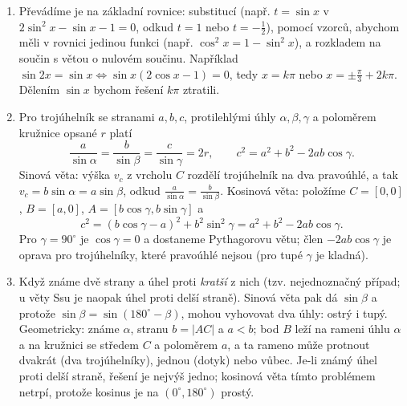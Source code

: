 \begin{enumerate}[label=\textbf{\arabic*.}, leftmargin=*, itemsep=0.8em]
  \item {}
  Převádíme je na základní rovnice: substitucí (např. $t = \sin x$ v $2\sin^2 x - \sin x - 1 = 0$, odkud $t = 1$ nebo $t = -\frac{1}{2}$), pomocí vzorců, abychom měli v rovnici jedinou funkci (např. $\cos^2 x = 1 - \sin^2 x$), a rozkladem na součin s větou o nulovém součinu. Například $\sin 2x = \sin x \Leftrightarrow \sin x(2\cos x - 1) = 0$, tedy $x = k\pi$ nebo $x = \pm\frac{\pi}{3} + 2k\pi$. Dělením $\sin x$ bychom řešení $k\pi$ ztratili.

  \item {}
  Pro trojúhelník se stranami $a, b, c$, protilehlými úhly $\alpha, \beta, \gamma$ a poloměrem kružnice opsané $r$ platí
  \begin{equation*}
    \frac{a}{\sin\alpha} = \frac{b}{\sin\beta} = \frac{c}{\sin\gamma} = 2r, \qquad c^2 = a^2 + b^2 - 2ab\cos\gamma.
  \end{equation*}
  Sinová věta: výška $v_c$ z vrcholu $C$ rozdělí trojúhelník na dva pravoúhlé, a tak $v_c = b\sin\alpha = a\sin\beta$, odkud $\frac{a}{\sin\alpha} = \frac{b}{\sin\beta}$. Kosinová věta: položíme $C = [0, 0]$, $B = [a, 0]$, $A = [b\cos\gamma, b\sin\gamma]$ a
  \begin{equation*}
    c^2 = {(b\cos\gamma - a)}^2 + b^2\sin^2\gamma = a^2 + b^2 - 2ab\cos\gamma.
  \end{equation*}
  Pro $\gamma = 90^\circ$ je $\cos\gamma = 0$ a dostaneme Pythagorovu větu; člen $-2ab\cos\gamma$ je oprava pro trojúhelníky, které pravoúhlé nejsou (pro tupé $\gamma$ je kladná). 

  \item {}
  Když známe dvě strany a úhel proti \emph{kratší} z nich (tzv. nejednoznačný případ; u věty Ssu je naopak úhel proti delší straně). Sinová věta pak dá $\sin\beta$ a protože $\sin\beta = \sin(180^\circ - \beta)$, mohou vyhovovat dva úhly: ostrý i tupý. Geometricky: známe $\alpha$, stranu $b = |AC|$ a $a < b$; bod $B$ leží na rameni úhlu $\alpha$ a na kružnici se středem $C$ a poloměrem $a$, a ta rameno může protnout dvakrát (dva trojúhelníky), jednou (dotyk) nebo vůbec. Je-li známý úhel proti delší straně, řešení je nejvýš jedno; kosinová věta tímto problémem netrpí, protože kosinus je na $(0^\circ, 180^\circ)$ prostý.
\end{enumerate}

